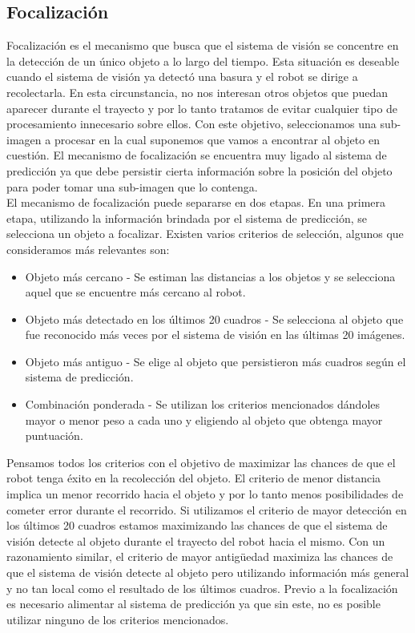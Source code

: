 	\subsection{Focalización}
	Focalización es el mecanismo que busca que el sistema de visión se 
	concentre en la detección de un único objeto a lo largo del tiempo. 
	Esta situación es deseable cuando el sistema de visión ya detectó 
	una basura y el robot se dirige a recolectarla. En esta circunstancia, 
	no nos interesan otros objetos que puedan aparecer durante el trayecto 
	y por lo tanto tratamos de evitar cualquier tipo de procesamiento 
	innecesario sobre ellos. Con este objetivo, seleccionamos una 
	sub-imagen a procesar en la cual suponemos que vamos a encontrar al 
	objeto en cuestión. El mecanismo de focalización se encuentra muy 
	ligado al sistema de predicción ya que debe persistir cierta 
	información sobre la posición del objeto para poder tomar una 
	sub-imagen que lo contenga.\\
\indent El mecanismo de focalización puede separarse en dos etapas. En una primera etapa, utilizando la información brindada por el sistema de predicción, se selecciona un objeto a focalizar. Existen varios criterios de selección, algunos que consideramos más relevantes son:
\begin{itemize}
\item{ Objeto más cercano - Se estiman las distancias a los objetos y se selecciona aquel que se encuentre más cercano al robot.}
\item{ Objeto más detectado en los últimos 20 cuadros - Se selecciona al objeto que fue reconocido más veces por el sistema de visión en las últimas 20 imágenes.}
\item{ Objeto más antiguo - Se elige al objeto que persistieron más cuadros según el sistema de predicción.}
\item{ Combinación ponderada - Se utilizan los  criterios mencionados dándoles mayor o menor peso a cada uno y eligiendo al objeto que obtenga mayor puntuación.}
\end{itemize}
Pensamos todos los criterios con el objetivo de maximizar las chances 
de que el robot tenga éxito en la recolección del objeto. El criterio de menor distancia implica un menor recorrido hacia el objeto y por lo tanto menos posibilidades de cometer error durante el recorrido. Si utilizamos el criterio de mayor detección en los últimos 20 cuadros estamos maximizando las chances de que el sistema de visión detecte al objeto durante el trayecto del robot hacia el mismo. Con un razonamiento similar, el criterio de mayor antigüedad maximiza las chances de que el sistema de visión detecte al objeto pero utilizando información más general y no tan local como el resultado de los últimos cuadros. Previo a la focalización es necesario alimentar al sistema de predicción ya que sin este, no es posible utilizar ninguno de los criterios mencionados.\\ 
